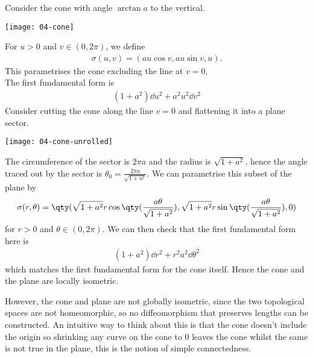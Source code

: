 \begin{example}
	Consider the cone with angle $\arctan a$ to the vertical.
	{\par
		\centering 
		\texttt{[image: 04-cone]} 
	\par}
	For $u > 0$ and $v \in (0,2\pi)$, we define
	\begin{align*}
		\sigma(u,v) = (au\cos v, au\sin v, u).
	\end{align*}
	This parametrises the cone excluding the line at $v = 0$. \\
	The first fundamental form is
	\begin{align*}
		(1+a^2)\dd{u}^2 + a^2 u^2 \dd{v}^2
	\end{align*}
	Consider cutting the cone along the line $v = 0$ and flattening it into a plane sector.
	{\par
		\centering 
		\texttt{[image: 04-cone-unrolled]} 
	\par}
	The circumference of the sector is $2 \pi a$ and the radius is $\sqrt{1+a^2}$, hence the angle traced out by the sector is $\theta_0 = \frac{2 \pi a}{\sqrt{1+a^2}}$.
	We can parametrise this subset of the plane by
	\begin{align*}
		\sigma(r,\theta) = \qty(\sqrt{1+a^2} r\cos\qty(\frac{a\theta}{\sqrt{1+a^2}}), \sqrt{1+a^2} r\sin\qty(\frac{a\theta}{\sqrt{1+a^2}}), 0)
	\end{align*}
	for $r > 0$ and $\theta \in (0,2\pi)$.
	We can then check that the first fundamental form here is
	\begin{align*}
		(1+a^2) \dd{r}^2 + r^2 a^2 \dd{\theta}^2
	\end{align*}
	which matches the first fundamental form for the cone itself.
	Hence the cone and the plane are locally isometric.

	However, the cone and plane are not globally isometric, since the two topological spaces are not homeomorphic, so no diffeomorphism that preserves lengths can be constructed.
	An intuitive way to think about this is that the cone doesn't include the origin so shrinking any curve on the cone to $0$ leaves the cone whilst the same is not true in the plane, this is the notion of simple connectedness.
\end{example}

